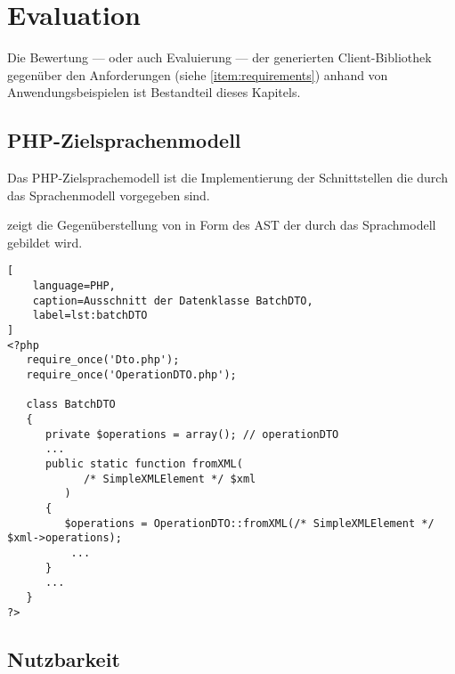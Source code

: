 \chapter{Evaluation}
\label{chap:evaluation}


Die Bewertung --- oder auch Evaluierung --- der generierten Client-Bibliothek gegenüber den Anforderungen (siehe \cref{item:requirements}) anhand von Anwendungsbeispielen ist Bestandteil dieses Kapitels.

\section{PHP-Zielsprachenmodell}
\label{sec:php_target_language_model}

Das PHP-Zielsprachemodell ist die Implementierung der Schnittstellen die durch das Sprachenmodell vorgegeben sind.

 zeigt die Gegenüberstellung von  in Form des \gls{AST} der durch das Sprachmodell gebildet wird. 

\begin{lstlisting}[
    language=PHP,
    caption=Ausschnitt der Datenklasse BatchDTO,
    label=lst:batchDTO
]
<?php
   require_once('Dto.php');
   require_once('OperationDTO.php');

   class BatchDTO
   {
      private $operations = array(); // operationDTO 
      ...
      public static function fromXML(
            /* SimpleXMLElement */ $xml
         )
      {
         $operations = OperationDTO::fromXML(/* SimpleXMLElement */ $xml->operations);
          ...
      }
      ...
   }
?>
\end{lstlisting}

\begin{sidewaysfigure}
    \centering
    \resizebox{1.0\textheight}{!}{
      
    }
    \caption{Darstellung von BatchDTO aus  im Sprachenmodell}
    \label{fig:modelRepresentationOfBatchDTO}
\end{sidewaysfigure}

\section{Nutzbarkeit}
\label{sec:usability}

